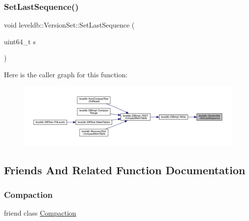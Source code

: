 \mbox{\label{classleveldb_1_1_version_set_a2234860e72a1ac7361d7bee107da6a07}} 
\subsubsection{\texorpdfstring{SetLastSequence()}{SetLastSequence()}}
{\footnotesize\ttfamily void leveldb\+::\+Version\+Set\+::\+Set\+Last\+Sequence (\begin{DoxyParamCaption}\item[{uint64\+\_\+t}]{s }\end{DoxyParamCaption})\hspace{0.3cm}{\ttfamily [inline]}}

Here is the caller graph for this function\+:
\nopagebreak
\begin{figure}[H]
\begin{center}
\leavevmode
\includegraphics[width=350pt]{classleveldb_1_1_version_set_a2234860e72a1ac7361d7bee107da6a07_icgraph}
\end{center}
\end{figure}


\subsection{Friends And Related Function Documentation}
\mbox{\label{classleveldb_1_1_version_set_a9372e882b35d27c78356228e4b758917}} 
\subsubsection{\texorpdfstring{Compaction}{Compaction}}
{\footnotesize\ttfamily friend class \mbox{\hyperlink{classleveldb_1_1_compaction}{Compaction}}\hspace{0.3cm}{\ttfamily [friend]}}

